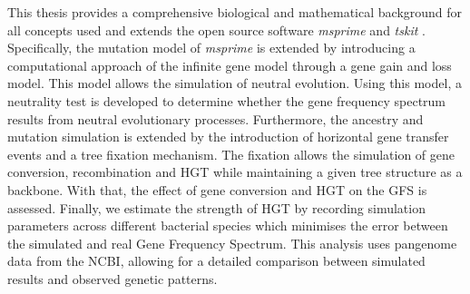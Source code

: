 This thesis provides a comprehensive biological and mathematical background for all concepts used and
extends the open source software \textit{msprime} and \textit{tskit} \cite{Msprime_Baumdicker_2022}.
Specifically, the mutation model of \textit{msprime} is extended by introducing a computational approach of the infinite gene model \cite{Baumdicker_2014} through a gene gain and loss model.
This model allows the simulation of neutral evolution.
Using this model, a neutrality test is developed to determine whether the gene frequency spectrum results from neutral evolutionary processes.
Furthermore, the ancestry and mutation simulation is extended by the introduction of horizontal gene transfer events and a tree fixation mechanism.
The fixation allows the simulation of gene conversion, recombination and \ac{HGT} while maintaining a given tree structure as a backbone.
With that, the effect of gene conversion and \ac{HGT} on the \ac{GFS} is assessed.
Finally, we estimate the strength of \ac{HGT} by recording simulation parameters across different bacterial species which minimises the error between the simulated and real Gene Frequency Spectrum.
This analysis uses pangenome data from the NCBI, allowing for a detailed comparison between simulated results and observed genetic patterns.